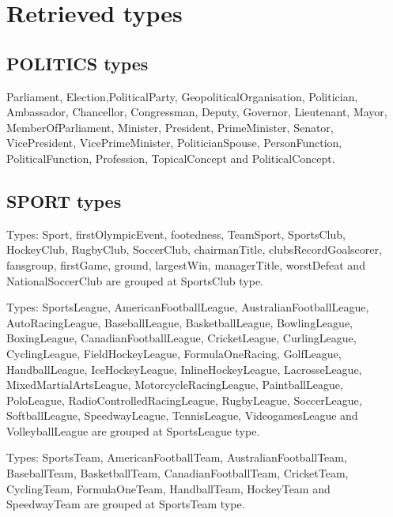 \documentclass[thesis=M,english]{FITthesis}[2018/05/30]
\begin{document}




\appendix
\chapter{Retrieved types}
\section{POLITICS types}\label{PoliticsTypes}
Parliament, Election,PoliticalParty, GeopoliticalOrganisation, Politician, Ambassador, Chancellor, Congressman, Deputy, Governor, Lieutenant, Mayor, MemberOfParliament, Minister, President, PrimeMinister, Senator, VicePresident, VicePrimeMinister, PoliticianSpouse, PersonFunction, PoliticalFunction, Profession, TopicalConcept and PoliticalConcept.

\section{SPORT types}\label{SportTypes}
Types: Sport, firstOlympicEvent, footedness, TeamSport, SportsClub, HockeyClub, RugbyClub, SoccerClub, chairmanTitle, clubsRecordGoalscorer, fansgroup, firstGame, ground, largestWin, managerTitle, worstDefeat and NationalSoccerClub are grouped at SportsClub type.

Types: SportsLeague, AmericanFootballLeague, AustralianFootballLeague, AutoRacingLeague, BaseballLeague, BasketballLeague, BowlingLeague, BoxingLeague, CanadianFootballLeague, CricketLeague, CurlingLeague, CyclingLeague, FieldHockeyLeague, FormulaOneRacing, GolfLeague, HandballLeague, IceHockeyLeague, InlineHockeyLeague, LacrosseLeague, MixedMartialArtsLeague, MotorcycleRacingLeague, PaintballLeague, PoloLeague, RadioControlledRacingLeague, RugbyLeague, SoccerLeague, SoftballLeague, SpeedwayLeague, TennisLeague, VideogamesLeague and VolleyballLeague are grouped at SportsLeague type.

Types: SportsTeam, AmericanFootballTeam, AustralianFootballTeam, BaseballTeam, BasketballTeam, CanadianFootballTeam, CricketTeam, CyclingTeam, FormulaOneTeam, HandballTeam, HockeyTeam and SpeedwayTeam are grouped at SportsTeam type.
\end{document}
